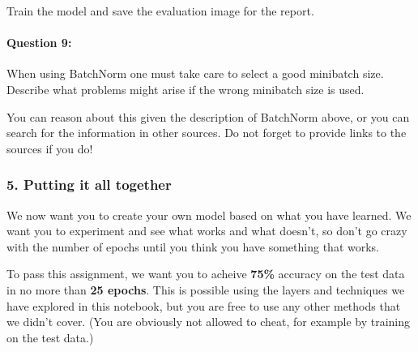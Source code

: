 \documentclass[11pt]{article}
\begin{document}
Train the model and save the evaluation image for the report.

    \hypertarget{question-9}{%
\paragraph{\texorpdfstring{\textbf{{Question
9:}}}{Question 9:}}\label{question-9}}

When using BatchNorm one must take care to select a good minibatch size.
Describe what problems might arise if the wrong minibatch size is used.

You can reason about this given the description of BatchNorm above, or
you can search for the information in other sources. Do not forget to
provide links to the sources if you do!

    \hypertarget{putting-it-all-together}{%
\subsubsection{\texorpdfstring{\textbf{5. Putting it all
together}}{5. Putting it all together}}\label{putting-it-all-together}}

We now want you to create your own model based on what you have learned.
We want you to experiment and see what works and what doesn't, so don't
go crazy with the number of epochs until you think you have something
that works.

To pass this assignment, we want you to acheive \textbf{75\%} accuracy
on the test data in no more than \textbf{25 epochs}. This is possible
using the layers and techniques we have explored in this notebook, but
you are free to use any other methods that we didn't cover. (You are
obviously not allowed to cheat, for example by training on the test
data.)
\end{document}
